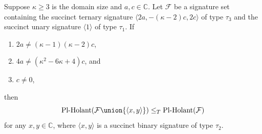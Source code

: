 \documentclass[11pt]{article}
\newcommand{\PlHolant}{\operatorname{Pl-Holant}}
\begin{document}
\begin{lemma} \label{lem:binary:2b+(k-2)c=0}
 Suppose $\kappa \ge 3$ is the domain size and $a, c \in \mathbb{C}$.
 Let $\mathcal{F}$ be a signature set containing the succinct ternary signature $\langle 2 a, -(\kappa - 2) c, 2 c \rangle$ of type $\tau_3$
 and the succinct unary signature $\langle 1 \rangle$ of type $\tau_1$.
 If
 \begin{enumerate}
  \item $2 a \ne (\kappa - 1) (\kappa - 2) c$, \label{cond:lem:binary:2b+(k-2)c=0:2a!=(k-1)(k-2)c}
  \item $4 a \ne (\kappa^2 - 6 \kappa + 4) c$, and \label{cond:lem:binary:2b+(k-2)c=0:4a!=(k^2-6k+4)c}
  \item $c \ne 0$, \label{cond:lem:binary:2b+(k-2)c=0:c!=0}
 \end{enumerate}
 then
 \[
  \PlHolant(\mathcal{F} \union \{\langle x,y \rangle\}) \le_T \PlHolant(\mathcal{F})
 \]
 for any $x,y \in \mathbb{C}$,
 where $\langle x,y \rangle$ is a succinct binary signature of type $\tau_2$.
\end{lemma}
\end{document}
